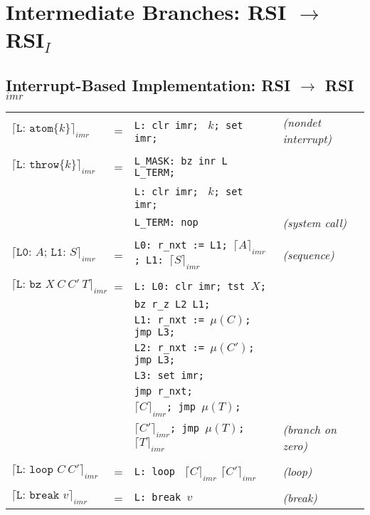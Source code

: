 \documentclass{article}
\newcommand{\compile}[2]{\lceil #2 \rceil_{#1}}
\begin{document}
\begin{tabular}{lllll}
\end{tabular}

\section{Intermediate Branches: RSI $\rightarrow$ RSI$_{I}$}

\subsection{Interrupt-Based Implementation: RSI $\rightarrow$ RSI$_{imr}$}

\begin{tabular}[t]{llll}
$\compile{imr}{\texttt{L: atom\{}k\}}$ &=& \texttt{L: clr imr; } $k$\texttt{; set imr;} &\emph{(nondet interrupt)}\\
\\
$\compile{imr}{\texttt{L: throw\{}k\}}$ &=& \texttt{L\_MASK: bz inr L L\_TERM;}\\
&&\texttt{L: clr imr; } $k$\texttt{; set imr;}\\
&&\texttt{L\_TERM: nop} &\emph{(system call)}\\
\\
$\compile{imr}{\texttt{L0: }A\texttt{; L1: }S}$ &=& \texttt{L0: r\_nxt := L1; }$\compile{imr}{A}$\texttt{; L1: }$\compile{imr}{S}$ &\emph{(sequence)}\\
\\
$\compile{imr}{\texttt{L: bz }X\ C\ C\prime\ T}$ &=& \texttt{L: L0: clr imr; tst }$X$\texttt{;}\\
&&\texttt{bz r\_z L2 L1;}\\
&&\texttt{L1: r\_nxt := }$\mu(C)$\texttt{; jmp L3;}\\
&&\texttt{L2: r\_nxt := }$\mu(C\prime)$\texttt{; jmp L3;}\\
&&\texttt{L3: set imr;}\\
&&\texttt{jmp r\_nxt;}\\
&&$\compile{imr}{C}$\texttt{; jmp }$\mu(T)$\texttt{; }\\
&&$\compile{imr}{C\prime}$\texttt{; jmp }$\mu(T)$\texttt{; }$\compile{imr}{T}$ &\emph{(branch on zero)}\\
\\
$\compile{imr}{\texttt{L: loop }C\ C\prime}$ &=& \texttt{L: loop } $\compile{imr}{C}$ $\compile{imr}{C\prime}$ &\emph{(loop)}\\
\\
$\compile{imr}{\texttt{L: break }v}$ &=& \texttt{L: break }$v$ &\emph{(break)}\\

\end{tabular}
\end{document}
